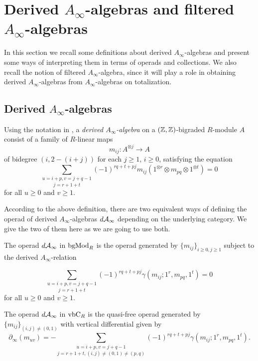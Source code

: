 \documentclass[join.tex]{subfiles}
\begin{document}
\section{Derived $A_\infty$-algebras and filtered $A_\infty$-algebras}\label{deriveddef}

In this section we recall some definitions about derived $A_\infty$-algebras and present some ways of interpreting them in terms of operads and collections. We also recall the notion of filtered $A_\infty$-algebra, since it will play a role in obtaining derived $A_\infty$-algebras from $A_\infty$-algebras on totalization.


\subsection{Derived $A_\infty$-algebras}

  \begin{defin}
  Using the notation in \cite{RW}, a \emph{derived $A_\infty$-algebra} on a $(\mathbb{Z},\mathbb{Z})$-bigraded $R$-module $A$ consist of a family of $R$-linear maps 
\[m_{ij}:A^{\otimes j}\to A\]
of bidegree $(i,2-(i+j))$ for each $j\geq 1$, $i\geq 0$, satisfying the equation
\[\underset{j=r+1+t}{\sum_{u=i+p, v=j+q-1}}(-1)^{rq+t+pj}m_{ij}(1^{\otimes r}\otimes m_{pq}\otimes 1^{\otimes t})=0\]
for all $u\geq 0$ and $v\geq 1$. 
\end{defin}

According to the above definition, there are two equivalent ways of defining the operad of derived $A_\infty$-algebras $d\mathcal{A}_\infty$ depending on the underlying category. We give the two of them here as we are going to use both.

\begin{defin}
The operad $d\mathcal{A}_\infty$ in $\mathrm{bgMod}_R$ is the operad generated by $\{m_{ij}\}_{i\geq 0,j\geq 1}$ subject to the derived $A_\infty$-relation

\[\underset{j=r+1+t}{\sum_{u=i+p, v=j+q-1}}(-1)^{rq+t+pj}\gamma(m_{ij};1^{ r}, m_{pq}, 1^{t})=0\]
for all $u\geq 0$ and $v\geq 1$. 

The operad $d\mathcal{A}_\infty$ in $\mathrm{vbC}_R$ is the quasi-free operad generated by $\{m_{ij}\}_{(i,j)\neq (0,1)}$ with vertical differential given by
\[\partial_\infty(m_{uv})=-\underset{j=r+1+t, (i,j)\neq (0,1)\neq (p,q)}{\sum_{u=i+p, v=j+q-1}}(-1)^{rq+t+pj}\gamma(m_{ij};1^{ r}, m_{pq}, 1^{t}).\]
\end{defin}
\end{document}

